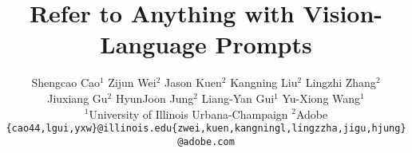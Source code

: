 \documentclass[10pt,twocolumn,letterpaper]{article}
\title{Refer to Anything with Vision-Language Prompts}
\author{%
Shengcao Cao$^1$ \quad Zijun Wei$^2$ \quad Jason Kuen$^2$ \quad Kangning Liu$^2$ \quad Lingzhi Zhang$^2$ \\
Jiuxiang Gu$^2$ \quad HyunJoon Jung$^2$ \quad Liang-Yan Gui$^1$ \quad Yu-Xiong Wang$^1$ \\
$^1$University of Illinois Urbana-Champaign \quad $^2$Adobe \\
{\small\texttt{\{cao44,lgui,yxw\}@illinois.edu\quad\{zwei,kuen,kangningl,lingzzha,jigu,hjung\}@adobe.com}}
}
\begin{document}
\maketitle















{
    \small
    
    
}


\end{document}
